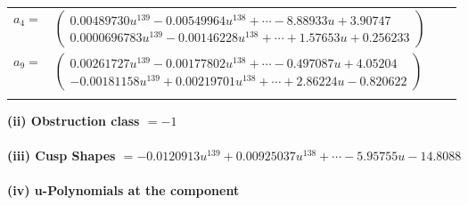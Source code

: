 \documentclass[1p]{elsarticle_modified}
\theoremstyle{definition}
\begin{document}
\begin{tabular}{m{7pt} m{180pt} m{7pt} m{180pt} }
\flushright $a_{4}=$&$\begin{pmatrix}0.00489730 u^{139}-0.00549964 u^{138}+\cdots-8.88933 u+3.90747\\0.0000696783 u^{139}-0.00146228 u^{138}+\cdots+1.57653 u+0.256233\end{pmatrix}$ \\
\flushright $a_{9}=$&$\begin{pmatrix}0.00261727 u^{139}-0.00177802 u^{138}+\cdots-0.497087 u+4.05204\\-0.00181158 u^{139}+0.00219701 u^{138}+\cdots+2.86224 u-0.820622\end{pmatrix}$\\&\end{tabular}
\flushleft \textbf{(ii) Obstruction class $= -1$}\\~\\
\flushleft \textbf{(iii) Cusp Shapes $= -0.0120913 u^{139}+0.00925037 u^{138}+\cdots-5.95755 u-14.8088$}\\~\\
\newpage\renewcommand{\arraystretch}{1}
\flushleft \textbf{(iv) u-Polynomials at the component}\newline \\
\end{document}
